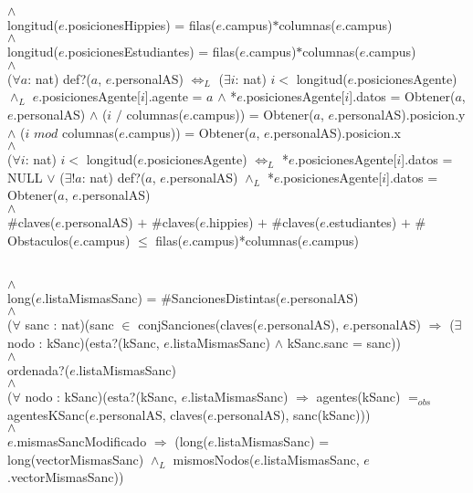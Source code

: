 {	\\
	$\land$
	\\
	longitud($e$.posicionesHippies) = filas($e$.campus)$*$columnas($e$.campus)
	\\
	$\land$
	\\
	longitud($e$.posicionesEstudiantes) = filas($e$.campus)$*$columnas($e$.campus)
	\\
	$\land$
	\\
	($\forall a$: nat) def?($a$, $e$.personalAS) $\Leftrightarrow_L$ ($\exists i$: nat) $i <$ longitud($e$.posicionesAgente) $\land_L$ $e$.posicionesAgente[$i$].agente = $a$ $\land$ *$e$.posicionesAgente[$i$].datos = Obtener($a$, $e$.personalAS) $\land$ ($i$ $/$ columnas($e$.campus)) = Obtener($a$, $e$.personalAS).posicion.y $\land$ ($i$ $mod$ columnas($e$.campus)) = Obtener($a$, $e$.personalAS).posicion.x
	\\
	$\land$
	\\
	($\forall i$: nat) $i <$ longitud($e$.posicionesAgente) $\Leftrightarrow_L$ *$e$.posicionesAgente[$i$].datos = NULL $\lor$ ($\exists! a$: nat) def?($a$, $e$.personalAS) $\land_L$ *$e$.posicionesAgente[$i$].datos = Obtener($a$, $e$.personalAS)
	\\
	$\land$
	\\
	$\#$claves($e$.personalAS) $+$ $\#$claves($e$.hippies) $+$ $\#$claves($e$.estudiantes) $+$ $\#$Obstaculos($e$.campus) $\leq$ filas($e$.campus)*columnas($e$.campus)
	
}\mbox{}
\\
	$\land$
	\\
	long($e$.listaMismasSanc) = $\#$SancionesDistintas($e$.personalAS)
	\\
	$\land$
	\\
	($\forall$ sanc : nat)(sanc $\in$ conjSanciones(claves($e$.personalAS), $e$.personalAS) $\Rightarrow$ ($\exists$ nodo : kSanc)(esta?(kSanc, $e$.listaMismasSanc) $\land$ kSanc.sanc = sanc))
	\\
	$\land$
	\\
	ordenada?($e$.listaMismasSanc)
	\\
	$\land$
	\\
	($\forall$ nodo : kSanc)(esta?(kSanc, $e$.listaMismasSanc) $\Rightarrow$ agentes(kSanc) $=_{obs}$ agentesKSanc($e$.personalAS, claves($e$.personalAS), sanc(kSanc)))
	\\
	$\land$
	\\
	$e$.mismasSancModificado $\Rightarrow$ (long($e$.listaMismasSanc) = long(vectorMismasSanc) $\land_L$ mismosNodos($e$.listaMismasSanc, $e$.vectorMismasSanc))
